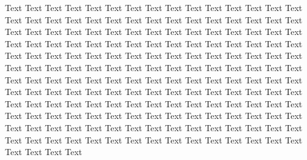 \documentclass{bioinfo}
\begin{document}
Text Text Text Text Text Text  Text Text Text Text Text Text Text Text  Text Text Text Text Text Text Text Text  Text Text Text Text Text Text Text Text  Text Text Text Text Text Text Text Text  Text Text Text Text Text Text Text Text  Text Text Text Text Text Text Text Text  Text Text Text Text Text Text Text Text  Text Text Text Text Text Text Text Text  Text Text Text Text Text Text Text Text  Text Text Text Text Text Text Text Text  Text Text Text Text Text Text Text Text  Text Text Text Text Text Text Text Text  Text Text Text Text Text Text Text Text  Text Text Text Text Text Text Text Text  Text Text Text Text Text Text Text Text  Text Text Text Text Text Text Text Text  Text Text Text Text Text Text Text Text  Text Text Text Text Text Text Text Text  Text Text Text Text Text Text Text Text  Text Text Text Text Text Text Text Text  Text Text Text Text Text Text Text Text  Text Text Text Text Text Text Text Text  Text Text 
\end{document}
